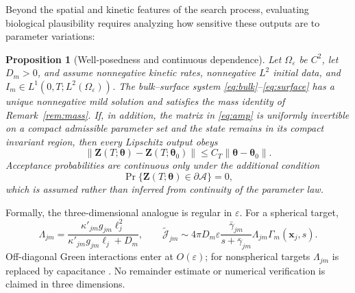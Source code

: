 \documentclass[pdflatex,sn-mathphys-num]{sn-jnl}
\numberwithin{equation}{section}
\theoremstyle{thmstyleone}%
\newtheorem{proposition}[theorem]{Proposition}
\theoremstyle{definition}
\theoremstyle{remark}
\begin{document}
Beyond the spatial and kinetic features of the search process, evaluating biological plausibility requires analyzing how sensitive these outputs are to parameter variations:

\begin{proposition}[Well-posedness and continuous dependence]
\label{prop:lip}
Let $\Omega_\varepsilon$ be $C^2$, let $D_m>0$, and assume nonnegative
kinetic rates, nonnegative $L^2$ initial data, and
$I_m\in L^1(0,T;L^2(\Omega_\varepsilon))$. The bulk--surface system
\eqref{eq:bulk}--\eqref{eq:surface} has a unique nonnegative mild solution and
satisfies the mass identity of Remark~\ref{rem:mass}. If, in addition, the
matrix in \eqref{eq:amp} is uniformly invertible on a compact admissible
parameter set and the state remains in its compact invariant region, then every
Lipschitz output obeys
\[
\|\mathbf Z(T;\boldsymbol\theta)-\mathbf Z(T;\boldsymbol\theta_0)\|
\leq C_T\|\boldsymbol\theta-\boldsymbol\theta_0\|.
\]
Acceptance probabilities are continuous only under the additional condition
\begin{equation}
\Pr\{\mathbf Z(T;\boldsymbol\theta)\in\partial\mathcal A\}=0,
\label{eq:nullbdry}
\end{equation}
which is assumed rather than inferred from continuity of the parameter law.
\end{proposition}

Formally, the three-dimensional analogue is regular in $\varepsilon$. For a
spherical target,
\[
\Lambda_{jm}=\frac{\kappa'_{jm}g_{jm}\ell_j^2}
{\kappa'_{jm}g_{jm}\ell_j+D_m},\qquad
\widetilde{\mathcal J}_{jm}\sim4\pi D_m\varepsilon
\frac{\bar\gamma_{jm}}{s+\bar\gamma_{jm}}\Lambda_{jm}\Gamma_m(\mathbf x_j,s).
\]
Off-diagonal Green interactions enter at $O(\varepsilon)$; for nonspherical
targets $\Lambda_{jm}$ is replaced by capacitance
\cite{smoluchowski1917versuch,collins1949diffusion,wang2025multi,grebenkov2020diffusion}.
No remainder estimate or numerical verification is claimed in three dimensions.
\end{document}
